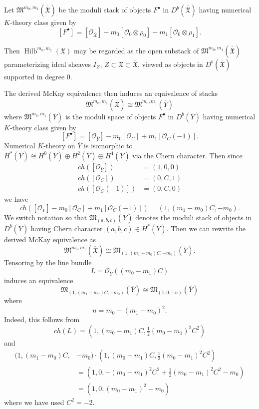\documentclass{amsart}
\theoremstyle{definition}
\newcommand{\X}{\mathfrak{X}}
\newcommand{\Xbar}{\overline{\mathfrak{X}}}
\newcommand{\Ybar}{\overline{Y}}
\newcommand{\M}{\mathfrak{M}}
\renewcommand{\O}{\mathcal{O}}
\newcommand{\Hilb}{\operatorname{Hilb}}
\begin{document}
Let $\M^{m_{0},m_{1}}(\Xbar )$ be the moduli stack of objects $F^{\bullet }$ in
$D^{b}(\Xbar )$ having numerical $K$-theory class given by
\[
[F^{\bullet}] = [\O_{\Xbar}] - m_{0}[\O_{0}\otimes \rho_{0}]  - m_{1}[\O_{0}\otimes \rho_{1}] .
\]

Then $\Hilb^{m_{0},m_{1}}(\X )$ may be regarded as the open substack
of $\M^{m_{0},m_{1}}(\Xbar )$ parameterizing ideal sheaves $I_{Z}$,
$Z\subset \X \subset \Xbar$, viewed as objects in $D^{b}(\Xbar )$
supported in degree 0.

The derived McKay equivalence then induces an equivalence of stacks
\[
\M^{m_{0},m_{1}}(\Xbar ) \cong  \M^{m_{0},m_{1}}(\Ybar )
\]
where $ \M^{m_{0},m_{1}}(\Ybar )$ is the moduli space of objects
$F^{\bullet}$ in $D^{b}(\Ybar )$ having numerical $K$-theory class given by
\[
[F^{\bullet}] = [\O_{\Ybar }] - m_{0} [\O_{C}]+ m_{1} [\O_{C}(-1)]. 
\]
Numerical $K$-theory on $\Ybar $ is isomorphic to $H^{*}(\Ybar )\cong
H^{0}(\Ybar )\oplus H^{2}(\Ybar )\oplus H^{4}(\Ybar )$ via the Chern
character. Then since
\begin{align*}
ch([\O_{\Ybar }]) &= (1,0,0)\\
ch([\O_{C}]) &= (0,C,1)\\
ch([\O_{C}(-1)]) &= (0,C,0)
\end{align*}
we have
\[
ch( [\O_{\Ybar }] - m_{0} [\O_{C}]+ m_{1} [\O_{C}(-1)]) = (1,(m_{1}-m_{0})C,-m_{0}).
\]
We switch notation so that $\M_{(a,b,c)}(\Ybar )$ denotes the moduli
stack of objects in $D^{b}(\Ybar )$ having Chern character $(a,b,c)\in
H^{*}(\Ybar )$. Then we can rewrite the derived McKay equivalence as
\[
\M^{m_{0},m_{1}}(\Xbar ) \cong \M_{(1,(m_{1}-m_{0})C,-m_{0})}(\Ybar ). 
\]
Tensoring by the line bundle
\[
L = \O_{\Ybar }((m_{0}-m_{1})C)
\]
induces an equivalence
\[
\M_{(1,(m_{1}-m_{0})C,-m_{0})}(\Ybar ) \cong \M_{(1,0,-n)}(\Ybar )
\]
where
\[
n=m_{0} -(m_{1}-m_{0})^{2}. 
\]
Indeed, this follows from
\[
ch(L) = \left(1,(m_{0}-m_{1})C,\tfrac{1}{2} (m_{0}-m_{1})^{2}C^{2} \right)
\]
and 
\begin{align*}
(1,(m_{1}-m_{0})C,&-m_{0}) \cdot  (1,(m_{0}-m_{1})C,\tfrac{1}{2}
(m_{0}-m_{1})^{2}C^{2})\\
 &= (1,0, - (m_{0}-m_{1})^{2}C^{2} +\tfrac{1}{2}
(m_{0}-m_{1})^{2}C^{2} -m_{0})\\
&= (1,0,(m_{0}-m_{1})^{2}-m_{0})
\end{align*}
where we have used $C^{2}=-2$.
\end{document}
